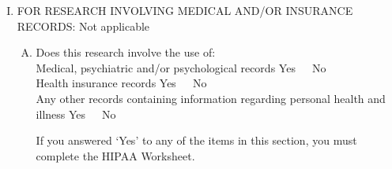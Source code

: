 \documentclass{article}
\newcommand{\na}{{\color{blue}Not applicable} }
\newcommand{\yn}{{Yes~~~No\\ }}
\begin{document}
\begin{enumerate}[I.]
\begin{enumerate}[A.]
                \item J. Does this material originate from a patient population
                    that, for religious or other reasons,
                            would prohibit its use in biomedical research?
                            Yes No Unknown source

           \end{enumerate}

    \item FOR RESEARCH INVOLVING MEDICAL AND/OR INSURANCE RECORDS: \na

            \begin{enumerate}[A.]
                \item Does this research involve the use of: \\
                      Medical, psychiatric and/or psychological records \yn
                      Health insurance records   \yn
                      Any other records containing information regarding personal
                                            health and illness \yn

                If you answered `Yes' to any of the items in this section, you
                must complete the HIPAA Worksheet.
            \end{enumerate}

\end{enumerate}
\end{document}
